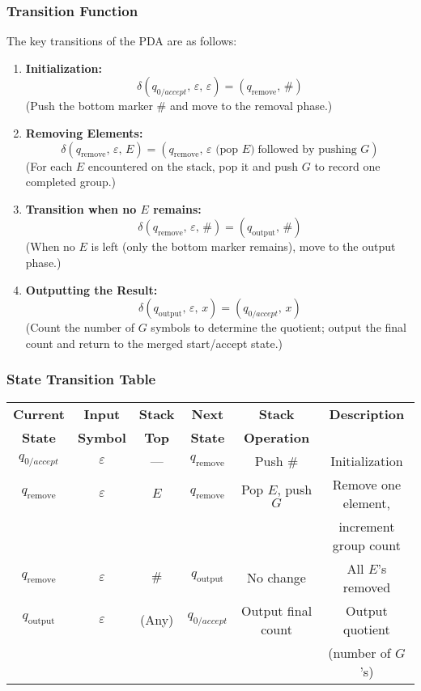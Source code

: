 \documentclass[11pt]{article}
\begin{document}
\subsubsection*{Transition Function}
The key transitions of the PDA are as follows:
\begin{enumerate}
    \item \textbf{Initialization:}  
    \[
    \delta(q_{0/accept},\, \varepsilon,\, \varepsilon) = (q_{\text{remove}},\, \#)
    \]
    (Push the bottom marker \(\#\) and move to the removal phase.)
    
    \item \textbf{Removing Elements:}  
    \[
    \delta(q_{\text{remove}},\, \varepsilon,\, E) = (q_{\text{remove}},\, \varepsilon \text{ (pop } E\text{)}\; \text{followed by pushing } G)
    \]
    (For each \(E\) encountered on the stack, pop it and push \(G\) to record one completed group.)
    
    \item \textbf{Transition when no \(E\) remains:}  
    \[
    \delta(q_{\text{remove}},\, \varepsilon,\, \#) = (q_{\text{output}},\, \#)
    \]
    (When no \(E\) is left (only the bottom marker remains), move to the output phase.)
    
    \item \textbf{Outputting the Result:}  
    \[
    \delta(q_{\text{output}},\, \varepsilon,\, x) = (q_{0/accept},\, x)
    \]
    (Count the number of \(G\) symbols to determine the quotient; output the final count and return to the merged start/accept state.)
\end{enumerate}

\subsubsection*{State Transition Table}
\begin{center}
\begin{tabular}{|c|c|c|c|c|c|}
\hline
\textbf{Current} & \textbf{Input} & \textbf{Stack } & \textbf{Next} & \textbf{Stack} &\textbf{Description}\\
\textbf{State} &  \textbf{Symbol} & \textbf{Top} & \textbf{State} & \textbf{Operation} &\\
\hline
\(q_{0/accept}\) & \(\varepsilon\) & --- & \(q_{\text{remove}}\) & Push \(\#\) & Initialization \\
\hline
\(q_{\text{remove}}\) & \(\varepsilon\) & \(E\) & \(q_{\text{remove}}\) & Pop \(E\), push \(G\) & Remove one element, \\
& & & & & increment group count \\
\hline
\(q_{\text{remove}}\) & \(\varepsilon\) & \(\#\) & \(q_{\text{output}}\) & No change & All \(E\)'s removed \\
\hline
\(q_{\text{output}}\) & \(\varepsilon\) & (Any) & \(q_{0/accept}\) & Output final count & Output quotient \\
& & & & & (number of \(G\)'s) \\
\hline
\end{tabular}
\end{center}
\end{document}
